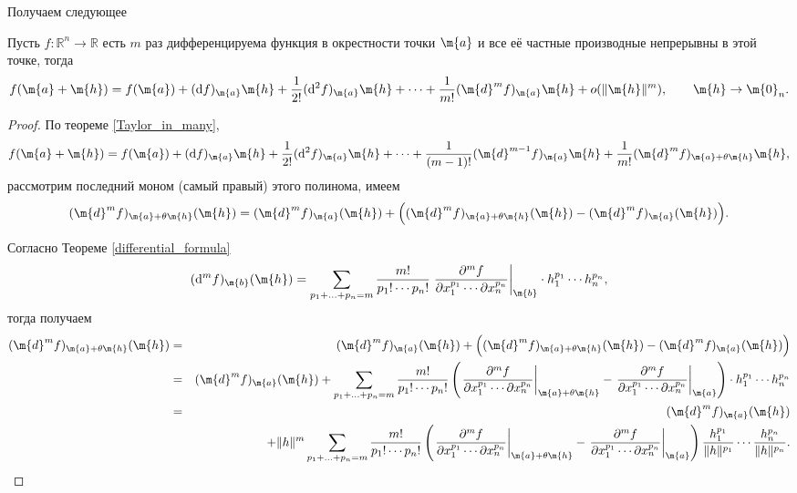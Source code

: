 Получаем следующее
\begin{corollary}\label{cor_for_Peano_in_many}
    Пусть $f:\mathbb{R}^n \to \mathbb{R}$ есть $m$ раз дифференцируема функция в окрестности точки $\m{a}$ и все её частные производные непрерывны в этой точке, тогда
    \[
     f(\m{a} + \m{h}) = f(\m{a}) + (\mathrm{d}f)_\m{a} \m{h} + \frac{1}{2!} (\mathrm{d}^2f)_\m{a}\m{h} + \cdots + \frac{1}{m!} (\m{d}^mf)_\m{a}\m{h} + o(\| \m{h} \|^m), \qquad \m{h} \to \m{0}_n.
    \]
\end{corollary}

\begin{proof}
    По теореме \ref{Taylor_in_many}, 
    \[
     f(\m{a} + \m{h}) = f(\m{a}) + (\mathrm{d}f)_\m{a} \m{h} + \frac{1}{2!} (\mathrm{d}^2f)_\m{a}\m{h} + \cdots + \frac{1}{(m-1)!} (\m{d}^{m-1}f)_\m{a}\m{h} + \frac{1}{m!} (\m{d}^{m}f)_{\m{a}+ \theta \m{h}}\m{h},
    \]
    рассмотрим последний моном (самый правый) этого полинома, имеем
    \[
    (\m{d}^{m}f)_{\m{a}+ \theta \m{h}}(\m{h})= (\m{d}^{m}f)_{\m{a}}(\m{h}) +  \Bigl( (\m{d}^{m}f)_{\m{a}+ \theta \m{h}}(\m{h}) - (\m{d}^{m}f)_{\m{a}} (\m{h}) \Bigr).
    \]

Согласно Теореме \ref{differential_formula}
    \[
     (\mathrm{d}^mf)_{\m{b}}(\m{h}) = \sum_{p_1 + \ldots + p_n = m} \dfrac{m!}{p_1! \cdots p_n!} \left.\frac{\partial^m f}{\partial x_1^{p_1} \cdots \partial x_n^{p_n}}\right|_{\m{b}} \cdot h_1^{p_1}\cdots h_n^{p_n},
     \]
тогда получаем
\begin{eqnarray*}
    (\m{d}^{m}f)_{\m{a}+ \theta \m{h}}(\m{h}) &=& (\m{d}^{m}f)_{\m{a}}(\m{h}) +  \Bigl( (\m{d}^{m}f)_{\m{a}+ \theta \m{h}}(\m{h}) - (\m{d}^{m}f)_{\m{a}} (\m{h}) \Bigr) \\
    &=& (\m{d}^{m}f)_{\m{a}}(\m{h}) + \sum_{p_1 + \ldots + p_n = m} \dfrac{m!}{p_1! \cdots p_n!}\left( \left.\frac{\partial^m f}{\partial x_1^{p_1} \cdots \partial x_n^{p_n}}\right|_{\m{a}+\theta \m{h}} - \left.\frac{\partial^m f}{\partial x_1^{p_1} \cdots \partial x_n^{p_n}}\right|_{\m{a}} \right)\cdot h_1^{p_1}\cdots h_n^{p_n} \\
    &=& (\m{d}^{m}f)_{\m{a}}(\m{h})\\
    &&+ \|h \|^m \sum_{p_1 + \ldots + p_n = m} \dfrac{m!}{p_1! \cdots p_n!}\left( \left.\frac{\partial^m f}{\partial x_1^{p_1} \cdots \partial x_n^{p_n}}\right|_{\m{a}+\theta \m{h}} - \left.\frac{\partial^m f}{\partial x_1^{p_1} \cdots \partial x_n^{p_n}}\right|_{\m{a}} \right) \frac{h_1^{p_1}}{\|h\|^{p_1}} \cdots \frac{h_n^{p_n}}{\|h\|^{p_n}}.
\end{eqnarray*}


\end{proof}
